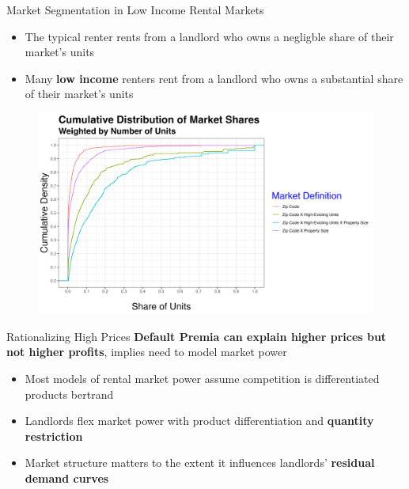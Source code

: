 \documentclass[10pt, xcolor=dvipsnames]{beamer}
\begin{document}
\begin{frame}{Market Segmentation in Low Income Rental Markets}
    \begin{itemize}
        \item The typical renter rents from a landlord who owns a negligble share of their market's units
        \item Many \textbf{low income} renters rent from a landlord who owns a substantial share of their market's units
    \end{itemize}
    \begin{figure}
        \centering
        \includegraphics[width=0.75\linewidth]{figs/market_share_cdf.png}
        \label{fig:market-share-cdf}
    \end{figure}
\end{frame}

    


\begin{frame}{Rationalizing High Prices}
\textbf{Default Premia can explain higher prices but not higher profits}, implies need to model market power
    \begin{itemize}
    \item Most models of rental market power assume competition is differentiated products bertrand \parencite{watson2024rent, framoutar2024market}
        \item Landlords flex market power with product differentiation and \textbf{quantity restriction}
        \item Market structure matters to the extent it influences landlords' \textbf{residual demand curves}
    \end{itemize}

\end{frame}
\end{document}

